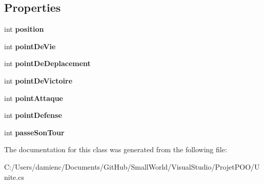\subsection*{Properties}
\begin{DoxyCompactItemize}
\item 
\hypertarget{class_small_world_1_1_unite_a5026a95644f7ad6ba98da19b630f8c4c}{int {\bfseries position}}\label{class_small_world_1_1_unite_a5026a95644f7ad6ba98da19b630f8c4c}

\item 
\hypertarget{class_small_world_1_1_unite_a43272b5b15924e0c4ed97d015da1ad3f}{int {\bfseries point\-De\-Vie}}\label{class_small_world_1_1_unite_a43272b5b15924e0c4ed97d015da1ad3f}

\item 
\hypertarget{class_small_world_1_1_unite_a0d8d8e328ff57a6b0b996619b4741a20}{int {\bfseries point\-De\-Deplacement}}\label{class_small_world_1_1_unite_a0d8d8e328ff57a6b0b996619b4741a20}

\item 
\hypertarget{class_small_world_1_1_unite_a81c19be68e5ba1ced9da2807ff6d8b1d}{int {\bfseries point\-De\-Victoire}}\label{class_small_world_1_1_unite_a81c19be68e5ba1ced9da2807ff6d8b1d}

\item 
\hypertarget{class_small_world_1_1_unite_afbb0da9c7ffe9df0ee6752d1b0c46737}{int {\bfseries point\-Attaque}}\label{class_small_world_1_1_unite_afbb0da9c7ffe9df0ee6752d1b0c46737}

\item 
\hypertarget{class_small_world_1_1_unite_ad6f9b4f0416b0f7b2c441ea08a2e1bdf}{int {\bfseries point\-Defense}}\label{class_small_world_1_1_unite_ad6f9b4f0416b0f7b2c441ea08a2e1bdf}

\item 
\hypertarget{class_small_world_1_1_unite_a0b805719ab3e147e8a0229323ae3b96e}{int {\bfseries passe\-Son\-Tour}}\label{class_small_world_1_1_unite_a0b805719ab3e147e8a0229323ae3b96e}

\end{DoxyCompactItemize}


The documentation for this class was generated from the following file\-:\begin{DoxyCompactItemize}
\item 
C\-:/\-Users/damienc/\-Documents/\-Git\-Hub/\-Small\-World/\-Visual\-Studio/\-Projet\-P\-O\-O/Unite.\-cs\end{DoxyCompactItemize}

